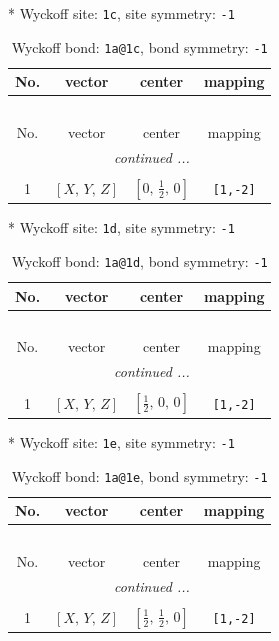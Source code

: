 \documentclass[fleqn,8pt]{jsarticle}
\begin{document}
* Wyckoff site: {\tt 1c}, site symmetry: {\tt -1}
\renewcommand{\arraystretch}{1.2}
\begin{longtable}{cccc}
\caption{Wyckoff bond: {\tt 1a@1c}, bond symmetry: {\tt -1}}
 \\
 \hline \hline
No. & vector & center & mapping \\ \hline \endfirsthead

\multicolumn{3}{l}{\tablename\ \thetable{}} \\
 \hline \hline
No. & vector & center & mapping \\ \hline \endhead

 \hline \hline
\multicolumn{3}{r}{\footnotesize\it continued ...} \\ \endfoot

 \hline \hline
\multicolumn{3}{r}{} \\ \endlastfoot

1 & $\left[ X,\, Y,\, Z \right]$ & $\left[ 0,\, \frac{1}{2},\, 0 \right]$ & {\tt [1,-2]} \\
\end{longtable}
* Wyckoff site: {\tt 1d}, site symmetry: {\tt -1}
\renewcommand{\arraystretch}{1.2}
\begin{longtable}{cccc}
\caption{Wyckoff bond: {\tt 1a@1d}, bond symmetry: {\tt -1}}
 \\
 \hline \hline
No. & vector & center & mapping \\ \hline \endfirsthead

\multicolumn{3}{l}{\tablename\ \thetable{}} \\
 \hline \hline
No. & vector & center & mapping \\ \hline \endhead

 \hline \hline
\multicolumn{3}{r}{\footnotesize\it continued ...} \\ \endfoot

 \hline \hline
\multicolumn{3}{r}{} \\ \endlastfoot

1 & $\left[ X,\, Y,\, Z \right]$ & $\left[ \frac{1}{2},\, 0,\, 0 \right]$ & {\tt [1,-2]} \\
\end{longtable}
* Wyckoff site: {\tt 1e}, site symmetry: {\tt -1}
\renewcommand{\arraystretch}{1.2}
\begin{longtable}{cccc}
\caption{Wyckoff bond: {\tt 1a@1e}, bond symmetry: {\tt -1}}
 \\
 \hline \hline
No. & vector & center & mapping \\ \hline \endfirsthead

\multicolumn{3}{l}{\tablename\ \thetable{}} \\
 \hline \hline
No. & vector & center & mapping \\ \hline \endhead

 \hline \hline
\multicolumn{3}{r}{\footnotesize\it continued ...} \\ \endfoot

 \hline \hline
\multicolumn{3}{r}{} \\ \endlastfoot

1 & $\left[ X,\, Y,\, Z \right]$ & $\left[ \frac{1}{2},\, \frac{1}{2},\, 0 \right]$ & {\tt [1,-2]} \\
\end{longtable}
\end{document}
